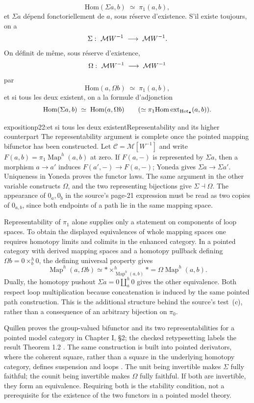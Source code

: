 
\[
\mathrm{Hom}(\Sigma a,b) \;\simeq\; \pi_1(a,b),
\]
et $\Sigma a$ dépend fonctoriellement de $a$, sous réserve d'existence. S'il existe toujours, on a
\[
\Sigma :\ \mathcal{M} W^{-1} \;\longrightarrow\; \mathcal{M} W^{-1}.
\]
On définit de même, sous réserve d'existence,
\[
\Omega :\ \mathcal{M} W^{-1} \;\longrightarrow\; \mathcal{M} W^{-1}
\]
par
\[
\mathrm{Hom}(a,\Omega b) \;\simeq\; \pi_1(a,b),
\]
et si tous les deux existent, on a la formule d'adjonction
\[
\mathrm{Hom}(\Sigma a,b) \;\simeq\; \mathrm{Hom}(a,\Omega b) \qquad (\simeq \pi_1\mathrm{Hom\,ext}_{\mathrm{Hot}_{\bullet}}(a,b)).
\]

\begin{dcomment}{exposition}{p22:et si tous les deux existent}{Representability and its higher counterpart}
The representability argument is complete once the pointed mapping bifunctor has been constructed. Let $\mathcal C=\mathcal M[W^{-1}]$ and write $F(a,b)=\pi_1\operatorname{Map}^{h}(a,b)$ at zero. If $F(a,-)$ is represented by $\Sigma a$, then a morphism $a\to a'$ induces $F(a',-)\to F(a,-)$; Yoneda gives $\Sigma a\to\Sigma a'$. Uniqueness in Yoneda proves the functor laws. The same argument in the other variable constructs $\Omega$, and the two representing bijections give $\Sigma\dashv\Omega$. The appearance of $0_a,0_b$ in the source's page-21 expression must be read as two copies of $0_{a,b}$, since both endpoints of a path lie in the same mapping space.

Representability of $\pi_1$ alone supplies only a statement on components of loop spaces. To obtain the displayed equivalences of whole mapping spaces one requires homotopy limits and colimits in the enhanced category. In a pointed category with derived mapping spaces and a homotopy pullback defining $\Omega b=0\times_b^h0$, the defining universal property gives
\[
 \operatorname{Map}^{h}(a,\Omega b)
  \simeq *\times_{\operatorname{Map}^{h}(a,b)}^h*
  =\Omega\operatorname{Map}^{h}(a,b).
\]
Dually, the homotopy pushout $\Sigma a=0\amalg_a^h0$ gives the other equivalence. Both respect loop multiplication because concatenation is induced by the same pointed path construction. This is the additional structure behind the source's test~(c), rather than a consequence of an arbitrary bijection on $\pi_0$.

Quillen proves the group-valued bifunctor and its two representabilities for a pointed model category in Chapter I, \S2; the checked retypesetting labels the result Theorem 1.2 \citep{Quillen1967}. The same construction is built into pointed derivators, where the coherent square, rather than a square in the underlying homotopy category, defines suspension and loops \citep[Definition 3.16 and Proposition 3.17]{Groth2013}. The unit being invertible makes $\Sigma$ fully faithful; the counit being invertible makes $\Omega$ fully faithful. If both are invertible, they form an equivalence. Requiring both is the stability condition, not a prerequisite for the existence of the two functors in a pointed model theory.


\end{dcomment}
